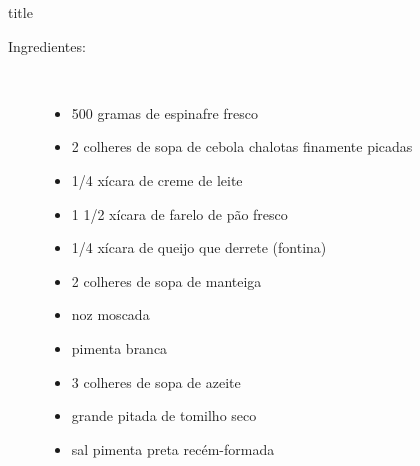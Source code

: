 \documentclass [11pt, letterpaper] {article}
\begin{document}
 {title}

\begin {description}

\item [Ingredientes:] \ \\
\begin {itemize}
\item 500 gramas de espinafre fresco
\item 2 colheres de sopa de cebola chalotas finamente picadas
\item 1/4 xícara de creme de leite
\item 1 1/2 xícara de farelo de pão fresco
\item 1/4 xícara de queijo que derrete (fontina)
\item 2 colheres de sopa de manteiga
\item noz moscada
\item pimenta branca
\item 3 colheres de sopa de azeite
\item grande pitada de tomilho seco
\item sal pimenta preta recém-formada
\end {itemize}


\end{description}
\end{document}
